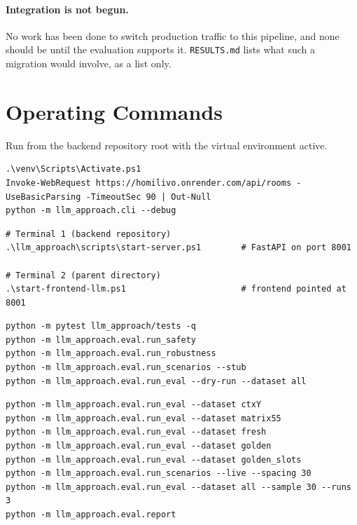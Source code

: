 \documentclass[11pt,a4paper]{article}
\newcommand{\fn}[1]{\texttt{\small #1}}
\begin{document}
\paragraph{Integration is not begun.} No work has been done to switch production traffic to
this pipeline, and none should be until the evaluation supports it. \fn{RESULTS.md} lists what
such a migration would involve, as a list only.

\appendix
\newpage
\section{Operating Commands}

Run from the backend repository root with the virtual environment active.

\begin{lstlisting}[caption={Interactive terminal harness --- live model, live rooms API}]
.\venv\Scripts\Activate.ps1
Invoke-WebRequest https://homilivo.onrender.com/api/rooms -UseBasicParsing -TimeoutSec 90 | Out-Null
python -m llm_approach.cli --debug
\end{lstlisting}

\begin{lstlisting}[caption={Full stack --- server and frontend, two terminals}]
# Terminal 1 (backend repository)
.\llm_approach\scripts\start-server.ps1        # FastAPI on port 8001

# Terminal 2 (parent directory)
.\start-frontend-llm.ps1                       # frontend pointed at 8001
\end{lstlisting}

\begin{lstlisting}[caption={Offline verification --- no network, no tokens consumed}]
python -m pytest llm_approach/tests -q
python -m llm_approach.eval.run_safety
python -m llm_approach.eval.run_robustness
python -m llm_approach.eval.run_scenarios --stub
python -m llm_approach.eval.run_eval --dry-run --dataset all
\end{lstlisting}

\begin{lstlisting}[caption={Live evaluation --- consumes token budget; run in this order}]
python -m llm_approach.eval.run_eval --dataset ctxY
python -m llm_approach.eval.run_eval --dataset matrix55
python -m llm_approach.eval.run_eval --dataset fresh
python -m llm_approach.eval.run_eval --dataset golden
python -m llm_approach.eval.run_eval --dataset golden_slots
python -m llm_approach.eval.run_scenarios --live --spacing 30
python -m llm_approach.eval.run_eval --dataset all --sample 30 --runs 3
python -m llm_approach.eval.report
\end{lstlisting}
\end{document}
